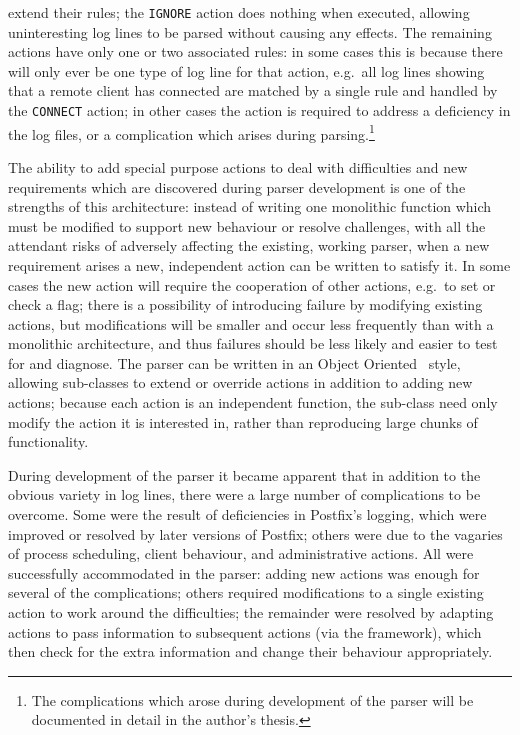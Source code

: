 \documentclass[draft]{svmult}
\begin{document}
extend their rules; the \texttt{IGNORE} action does nothing when executed,
allowing uninteresting log lines to be parsed without causing any effects.
The remaining actions have only one or two associated rules: in some cases
this is because there will only ever be one type of log line for that
action, e.g.\ all log lines showing that a remote client has connected are
matched by a single rule and handled by the \texttt{CONNECT} action; in
other cases the action is required to address a deficiency in the log
files, or a complication which arises during
parsing.\footnote{\label{complications footnote}The complications which
arose during development of the parser will be documented in detail in the
author's thesis.}

The ability to add special purpose actions to deal with difficulties and
new requirements which are discovered during parser development is one of
the strengths of this architecture: instead of writing one monolithic
function which must be modified to support new behaviour or resolve
challenges, with all the attendant risks of adversely affecting the
existing, working parser, when a new requirement arises a new, independent
action can be written to satisfy it.  In some cases the new action will
require the cooperation of other actions, e.g.\ to set or check a flag;
there is a possibility of introducing failure by modifying existing
actions, but modifications will be smaller and occur less frequently than
with a monolithic architecture, and thus failures should be less likely and
easier to test for and diagnose.  The parser can be written in an Object
Oriented~\cite{Wikipedia-object-orientation} style, allowing sub-classes to
extend or override actions in addition to adding new actions; because each
action is an independent function, the sub-class need only modify the
action it is interested in, rather than reproducing large chunks of
functionality.

\label{complications}

During development of the parser it became apparent that in addition to the
obvious variety in log lines, there were a large number of complications to
be overcome.  Some were the result of
deficiencies in Postfix's logging, which were improved or resolved by later
versions of Postfix; others were due to the vagaries of process scheduling,
client behaviour, and administrative actions.  All were successfully
accommodated in the parser: adding new actions was enough for several of
the complications; others required modifications to a single existing
action to work around the difficulties; the remainder were resolved by
adapting actions to pass information to subsequent actions (via the
framework), which then check for the extra information and change their
behaviour appropriately.
\end{document}

